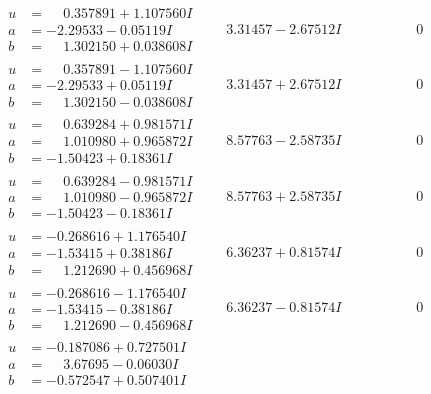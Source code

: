 \documentclass[1p]{elsarticle_modified}
\theoremstyle{definition}
\begin{document}
$$\begin{array}{c|c|c}
\begin{aligned}
u &= \phantom{-}0.357891 + 1.107560 I \\
a &= -2.29533 - 0.05119 I \\
b &= \phantom{-}1.302150 + 0.038608 I\end{aligned}
 & \phantom{-}3.31457 - 2.67512 I & \phantom{-0.000000 } 0 \\ \hline\begin{aligned}
u &= \phantom{-}0.357891 - 1.107560 I \\
a &= -2.29533 + 0.05119 I \\
b &= \phantom{-}1.302150 - 0.038608 I\end{aligned}
 & \phantom{-}3.31457 + 2.67512 I & \phantom{-0.000000 } 0 \\ \hline\begin{aligned}
u &= \phantom{-}0.639284 + 0.981571 I \\
a &= \phantom{-}1.010980 + 0.965872 I \\
b &= -1.50423 + 0.18361 I\end{aligned}
 & \phantom{-}8.57763 - 2.58735 I & \phantom{-0.000000 } 0 \\ \hline\begin{aligned}
u &= \phantom{-}0.639284 - 0.981571 I \\
a &= \phantom{-}1.010980 - 0.965872 I \\
b &= -1.50423 - 0.18361 I\end{aligned}
 & \phantom{-}8.57763 + 2.58735 I & \phantom{-0.000000 } 0 \\ \hline\begin{aligned}
u &= -0.268616 + 1.176540 I \\
a &= -1.53415 + 0.38186 I \\
b &= \phantom{-}1.212690 + 0.456968 I\end{aligned}
 & \phantom{-}6.36237 + 0.81574 I & \phantom{-0.000000 } 0 \\ \hline\begin{aligned}
u &= -0.268616 - 1.176540 I \\
a &= -1.53415 - 0.38186 I \\
b &= \phantom{-}1.212690 - 0.456968 I\end{aligned}
 & \phantom{-}6.36237 - 0.81574 I & \phantom{-0.000000 } 0 \\ \hline\begin{aligned}
u &= -0.187086 + 0.727501 I \\
a &= \phantom{-}3.67695 - 0.06030 I \\
b &= -0.572547 + 0.507401 I\end{aligned}

\end{array}$$
\end{document}
